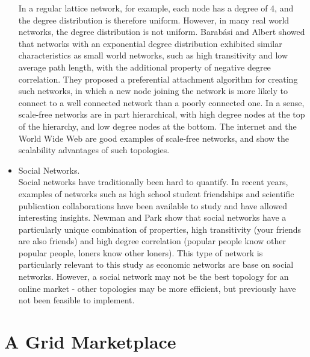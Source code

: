 \begin{itemize}
    In a regular lattice network, for example, each node has a degree of 4, and
    the degree distribution is therefore uniform.  However, in many real world
    networks, the degree distribution is not uniform. Barab{\'{a}}si and Albert
    \cite{net-barabasi99-scaling} showed that networks with an exponential
    degree distribution exhibited similar characteristics as small world
    networks, such as high transitivity and low average path length, with the
    additional property of negative degree correlation.  They proposed a
    preferential attachment algorithm for creating such networks, in which a
    new node joining the network is more likely to connect to a well connected
    network than a poorly connected one.  In a sense, scale-free networks are
    in part hierarchical, with high degree nodes at the top of the
    hierarchy, and low degree nodes at the bottom. The internet and the World
    Wide Web are good examples of scale-free networks, and show the scalability
    advantages of such topologies. 

  \item Social Networks.\\
    
    Social networks have traditionally been hard to quantify. In recent years,
    examples of networks such as high school student friendships and scientific publication
    collaborations have been available to study and have allowed interesting
    insights. Newman and Park\cite{net-newman03-social} show that social
    networks have a particularly unique combination of properties, high
    transitivity (your friends are also friends) and high degree correlation
    (popular people know other popular people, loners know other loners). This
    type of network is particularly relevant to this study as economic networks
    are base on social networks. However, a social network may not be the best
    topology for an online market - other topologies may be more efficient,
    but previously have not been feasible to implement.

\end{itemize}




\section{A Grid Marketplace}

